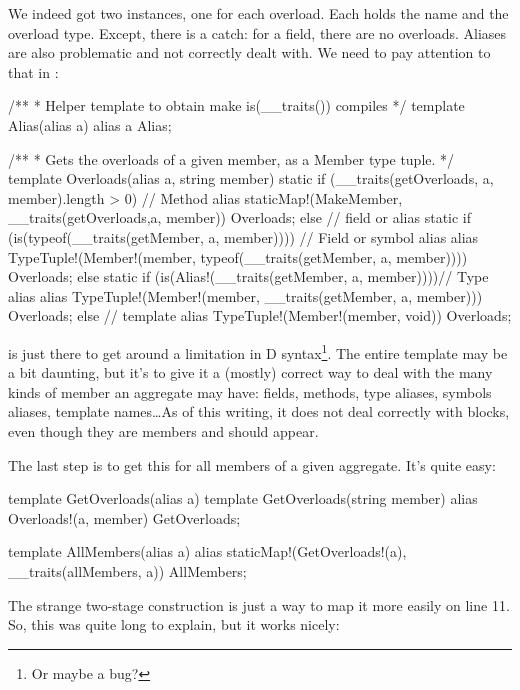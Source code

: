 We indeed got two  instances, one for each overload. Each  holds the name  and the overload type. Except, there is a catch: for a field, there are no overloads. Aliases are also problematic and not correctly dealt with. We need to pay attention to that in :

\begin{dcode}
/**
 * Helper template to obtain make is(__traits()) compiles
 */
template Alias(alias a)
{
    alias a Alias;
}

/**
 * Gets the overloads of a given member, as a Member type tuple.
 */
template Overloads(alias a, string member)
{
    static if (__traits(getOverloads, a, member).length > 0) // Method
        alias staticMap!(MakeMember, __traits(getOverloads,a, member))
              Overloads;
    else // field or alias
        static if (is(typeof(__traits(getMember, a, member)))) // Field or symbol alias
            alias TypeTuple!(Member!(member, typeof(__traits(getMember, a, member)))) 
                  Overloads;
        else static if (is(Alias!(__traits(getMember, a, member))))// Type alias
            alias TypeTuple!(Member!(member, __traits(getMember, a, member)))
                  Overloads;
        else // template
            alias TypeTuple!(Member!(member, void))
                  Overloads;
}
\end{dcode}

 is just there to get around a limitation in D syntax\footnote{ Or maybe a bug?}. The entire template may be a bit daunting, but it's to give it a (mostly) correct way to deal with the many kinds of member an aggregate may have: fields, methods, type aliases, symbols aliases, template names\ldots As of this writing, it does not deal correctly with \DD{\{\}} blocks, even  though they are members and should appear.

The last step is to get this for all members of a given aggregate. It's quite easy:

\begin{ndcode}
template GetOverloads(alias a)
{
    template GetOverloads(string member)
    {
        alias Overloads!(a, member) GetOverloads;
    }
}

template AllMembers(alias a)
{
    alias staticMap!(GetOverloads!(a), __traits(allMembers, a)) AllMembers; 
}
\end{ndcode}

The strange  two-stage construction is just a way to map it more easily on line 11. So, this was quite long to explain, but it works nicely:

